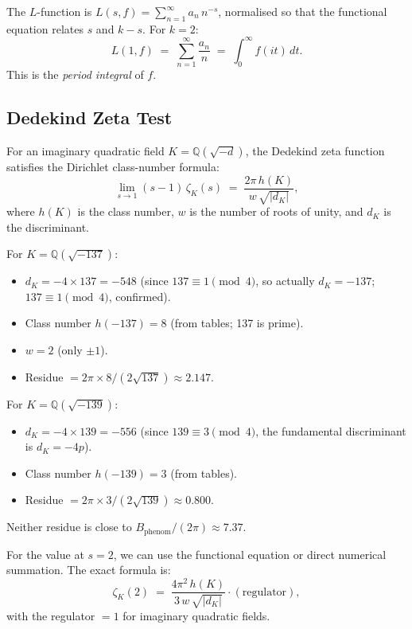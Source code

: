 \documentclass[12pt,a4paper]{article}
\theoremstyle{definition}
\theoremstyle{remark}
\begin{document}
The $L$-function is $L(s,f) = \sum_{n=1}^\infty a_n\,n^{-s}$, normalised
so that the functional equation relates $s$ and $k-s$.  For $k=2$:
\begin{equation}
  L(1,f) \;=\; \sum_{n=1}^\infty \frac{a_n}{n}
            \;=\; \int_0^\infty f(it)\,dt.
\end{equation}
This is the \emph{period integral} of $f$.

\subsection{Dedekind Zeta Test}
\label{subsec:A1_dedekind}

For an imaginary quadratic field $K = \mathbb{Q}(\sqrt{-d})$, the
Dedekind zeta function satisfies the Dirichlet class-number formula:
\begin{equation}
  \lim_{s\to 1}(s-1)\,\zeta_K(s) \;=\;
  \frac{2\pi\,h(K)}{w\,\sqrt{|d_K|}},
\end{equation}
where $h(K)$ is the class number, $w$ is the number of roots of unity,
and $d_K$ is the discriminant.

For $K = \mathbb{Q}(\sqrt{-137})$:
\begin{itemize}
  \item $d_K = -4 \times 137 = -548$ (since $137 \equiv 1 \pmod{4}$, so
        actually $d_K = -137$; $137 \equiv 1 \pmod{4}$, confirmed).
  \item Class number $h(-137) = 8$ (from tables; 137 is prime).
  \item $w = 2$ (only $\pm 1$).
  \item Residue $= 2\pi \times 8 / (2\sqrt{137}) \approx 2.147$.
\end{itemize}

For $K = \mathbb{Q}(\sqrt{-139})$:
\begin{itemize}
  \item $d_K = -4 \times 139 = -556$ (since $139 \equiv 3 \pmod{4}$, the fundamental discriminant is $d_K = -4p$).
  \item Class number $h(-139) = 3$ (from tables).
  \item Residue $= 2\pi \times 3 / (2\sqrt{139}) \approx 0.800$.
\end{itemize}

Neither residue is close to $B_{\mathrm{phenom}}/(2\pi) \approx 7.37$.

\medskip
For the value at $s=2$, we can use the functional equation or direct
numerical summation.  The exact formula is:
\begin{equation}
  \zeta_K(2) \;=\;
  \frac{4\pi^2\,h(K)}{3\,w\,\sqrt{|d_K|}}\cdot(\text{regulator}) ,
\end{equation}
with the regulator $= 1$ for imaginary quadratic fields.
\end{document}
